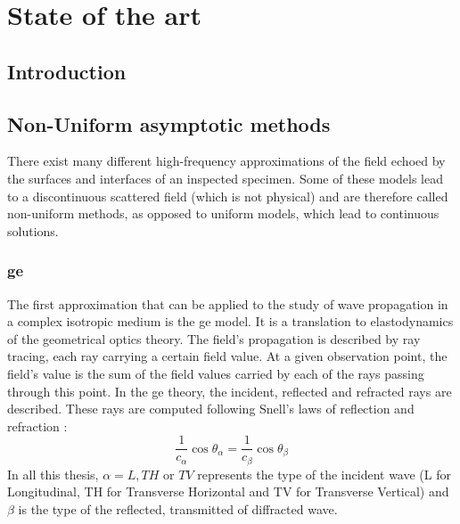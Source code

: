 \chapter[][Sate of the Art]{State of the art}
\label{chap-biblio}

\section*{Introduction}

\section{Non-Uniform asymptotic methods}

There exist many different high-frequency approximations of the field echoed by the surfaces and interfaces of an inspected specimen. Some of these models lead to a discontinuous scattered field (which is not physical) and are therefore called non-uniform methods, as opposed to uniform models, which lead to continuous solutions.
\subsection{\acrfull{ge}}
The first approximation that can be applied to the study of wave propagation in a complex isotropic medium is the \acrfull{ge} model. It is a translation to elastodynamics of the geometrical optics theory. The field's propagation is described by ray tracing, each ray carrying a certain field value. At a given observation point, the field's value is the sum of the field values carried by each of the rays passing through this point. In the \acrshort{ge} theory, the incident, reflected and refracted rays are described. These rays are computed following Snell's laws of reflection and refraction :
\begin{equation}
    \frac{1}{c_{\alpha}}\cos\theta_{\alpha} = \frac{1}{c_{\beta}} \cos\theta_{\beta}
    \label{Snellrefl}
\end{equation}
In all this thesis, $\alpha=L,TH$ or $TV$ represents the type of the incident wave (\acrshort{L} for Longitudinal, \acrshort{TH} for Transverse Horizontal and \acrshort{TV} for Transverse Vertical) and $\beta$ is the type of the reflected, transmitted of diffracted wave.

